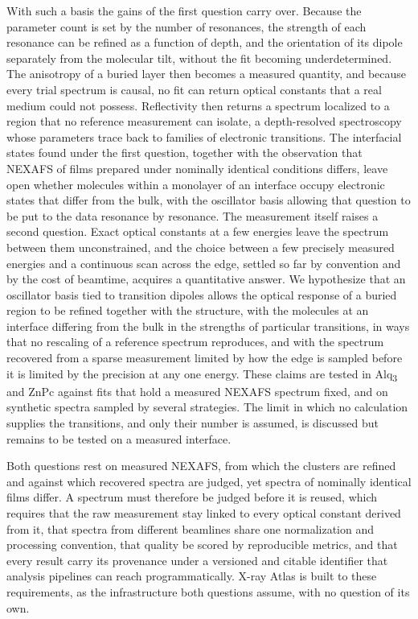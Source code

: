 With such a basis the gains of the first question carry over. Because the parameter count is set by the number of resonances, the strength of each resonance can be refined as a function of depth, and the orientation of its dipole separately from the molecular tilt, without the fit becoming underdetermined. The anisotropy of a buried layer then becomes a measured quantity, and because every trial spectrum is causal, no fit can return optical constants that a real medium could not possess. Reflectivity then returns a spectrum localized to a region that no reference measurement can isolate, a depth-resolved spectroscopy whose parameters trace back to families of electronic transitions. The interfacial states found under the first question, together with the observation that NEXAFS of films prepared under nominally identical conditions differs, leave open whether molecules within a monolayer of an interface occupy electronic states that differ from the bulk, with the oscillator basis allowing that question to be put to the data resonance by resonance. The measurement itself raises a second question. Exact optical constants at a few energies leave the spectrum between them unconstrained, and the choice between a few precisely measured energies and a continuous scan across the edge, settled so far by convention and by the cost of beamtime, acquires a quantitative answer. We hypothesize that an oscillator basis tied to transition dipoles allows the optical response of a buried region to be refined together with the structure, with the molecules at an interface differing from the bulk in the strengths of particular transitions, in ways that no rescaling of a reference spectrum reproduces, and with the spectrum recovered from a sparse measurement limited by how the edge is sampled before it is limited by the precision at any one energy. These claims are tested in Alq\textsubscript{3} and ZnPc against fits that hold a measured NEXAFS spectrum fixed, and on synthetic spectra sampled by several strategies. The limit in which no calculation supplies the transitions, and only their number is assumed, is discussed but remains to be tested on a measured interface.

Both questions rest on measured NEXAFS, from which the clusters are refined and against which recovered spectra are judged, yet spectra of nominally identical films differ. A spectrum must therefore be judged before it is reused, which requires that the raw measurement stay linked to every optical constant derived from it, that spectra from different beamlines share one normalization and processing convention, that quality be scored by reproducible metrics, and that every result carry its provenance under a versioned and citable identifier that analysis pipelines can reach programmatically. X-ray Atlas is built to these requirements, as the infrastructure both questions assume, with no question of its own.

